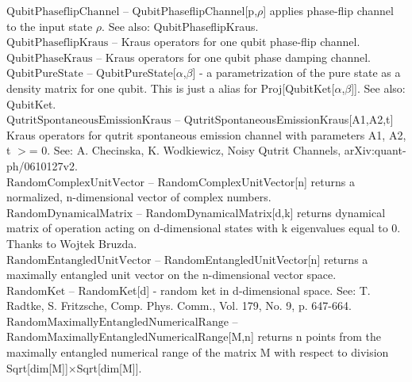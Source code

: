 \documentclass[a4paper,10pt]{scrartcl}
\begin{document}
\textbf{$ \text{QubitPhaseflipChannel} $ }-- QubitPhaseflipChannel[p,$\rho $] applies phase-flip channel to the input state $\rho $. See also: QubitPhaseflipKraus.$  $\\

\textbf{$ \text{QubitPhaseflipKraus} $ }-- Kraus operators for one qubit phase-flip channel.$  $\\

\textbf{$ \text{QubitPhaseKraus} $ }-- Kraus operators for one qubit phase damping channel.$  $\\

\textbf{$ \text{QubitPureState} $ }-- QubitPureState[$\alpha $,$\beta $] - a parametrization of the pure state as a density matrix for one qubit. This is just a alias for Proj[QubitKet[$\alpha $,$\beta $]]. See also: QubitKet.$  $\\

\textbf{$ \text{QutritSpontaneousEmissionKraus} $ }-- QutritSpontaneousEmissionKraus[A1,A2,t] Kraus operators for qutrit spontaneous emission channel with parameters A1, A2, t $>$= 0. See: A. Checinska, K. Wodkiewicz, Noisy Qutrit Channels, arXiv:quant-ph/0610127v2.$  $\\

\textbf{$ \text{RandomComplexUnitVector} $ }-- RandomComplexUnitVector[n] returns a normalized, n-dimensional vector of complex numbers.$  $\\

\textbf{$ \text{RandomDynamicalMatrix} $ }-- RandomDynamicalMatrix[d,k] returns dynamical matrix of operation acting on d-dimensional states with k eigenvalues equal to 0. Thanks to Wojtek Bruzda.$  $\\

\textbf{$ \text{RandomEntangledUnitVector} $ }-- RandomEntangledUnitVector[n] returns a maximally entangled unit vector on the n-dimensional vector space.$  $\\

\textbf{$ \text{RandomKet} $ }-- RandomKet[d] - random ket in d-dimensional space. See: T. Radtke, S. Fritzsche, Comp. Phys. Comm., Vol. 179, No. 9, p. 647-664.$  $\\

\textbf{$ \text{RandomMaximallyEntangledNumericalRange} $ }-- RandomMaximallyEntangledNumericalRange[M,n] returns n points from the maximally entangled numerical range of the matrix M with respect to division Sqrt[dim[M]]$\times $Sqrt[dim[M]].$  $\\
\end{document}
